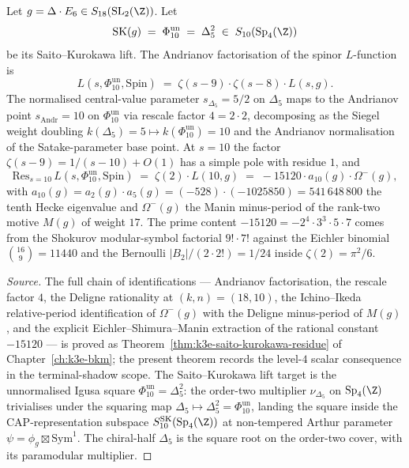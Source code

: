 \begin{theorem}
\label{thm:terminus-saito-kurokawa-residue}
Let $g = \Delta \cdot E_6 \in S_{18}(\mathrm{SL}_2(\Z))$.  Let
\[
 \mathrm{SK}(g) \;=\; \Phi_{10}^{\mathrm{un}} \;=\;
 \Delta_5^2 \;\in\; S_{10}(\mathrm{Sp}_4(\Z))
\]
be its Saito--Kurokawa lift.  The Andrianov factorisation of the
spinor $L$-function is
\[
 L(s, \Phi_{10}^{\mathrm{un}}, \mathrm{Spin}) \;=\;
 \zeta(s - 9) \cdot \zeta(s - 8) \cdot L(s, g).
\]
The normalised central-value parameter
$s_{\Delta_5} = 5/2$ on $\Delta_5$ maps to the Andrianov point
$s_{\mathrm{Andr}} = 10$ on $\Phi_{10}^{\mathrm{un}}$ via rescale
factor $4 = 2 \cdot 2$, decomposing as the Siegel weight doubling
$k(\Delta_5) = 5 \mapsto k(\Phi_{10}^{\mathrm{un}}) = 10$ and the
Andrianov normalisation of the Satake-parameter base point.  At
$s = 10$ the factor $\zeta(s - 9) = 1/(s - 10) + O(1)$ has a
simple pole with residue $1$, and
\[
 \mathrm{Res}_{s = 10}\, L(s, \Phi_{10}^{\mathrm{un}}, \mathrm{Spin})
 \;=\; \zeta(2) \cdot L(10, g)
 \;=\; -15120 \cdot a_{10}(g) \cdot \Omega^-(g),
\]
with $a_{10}(g) = a_2(g) \cdot a_5(g) = (-528) \cdot (-1025850)
= 541\,648\,800$ the tenth Hecke eigenvalue and $\Omega^-(g)$ the
Manin minus-period of the rank-two motive $M(g)$ of weight $17$.
The prime content $-15120 = -2^4 \cdot 3^3 \cdot 5 \cdot 7$ comes
from the Shokurov modular-symbol factorial $9! \cdot 7!$ against the
Eichler binomial $\binom{16}{9} = 11440$ and the Bernoulli
$|B_2|/(2 \cdot 2!) = 1/24$ inside $\zeta(2) = \pi^2/6$.
\end{theorem}

\begin{proof}[Source]
The full chain of identifications --- Andrianov factorisation, the
rescale factor $4$, the Deligne rationality at $(k, n) = (18, 10)$,
the Ichino--Ikeda relative-period identification of $\Omega^-(g)$
with the Deligne minus-period of $M(g)$, and the explicit
Eichler--Shimura--Manin extraction of the rational constant
$-15120$ --- is proved as
Theorem~\ref{thm:k3e-saito-kurokawa-residue} of
Chapter~\ref{ch:k3e-bkm}; the present theorem records the
level-$4$ scalar consequence in the terminal-shadow scope.  The Saito--Kurokawa lift target is the unnormalised Igusa square
$\Phi_{10}^{\mathrm{un}} = \Delta_5^2$: the order-two multiplier
$\nu_{\Delta_5}$ on $\mathrm{Sp}_4(\Z)$ trivialises under the
squaring map $\Delta_5 \mapsto \Delta_5^2 = \Phi_{10}^{\mathrm{un}}$,
landing the square inside the CAP-representation subspace
$S_{10}^{\mathrm{SK}}(\mathrm{Sp}_4(\Z))$ at non-tempered Arthur
parameter $\psi = \phi_g \boxtimes \mathrm{Sym}^1$. The chiral-half
$\Delta_5$ is the square root on the order-two cover, with its
paramodular multiplier.
\end{proof}

